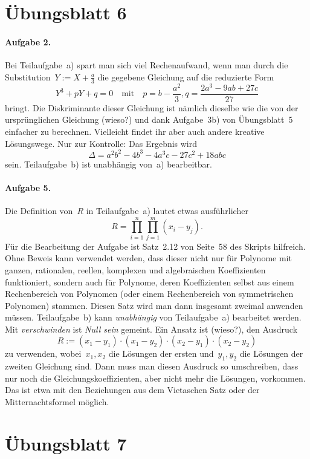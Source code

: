 \documentclass{../algblatt}
\begin{document}
\section*{Übungsblatt 6}

\paragraph{Aufgabe 2.} Bei Teilaufgabe~a) spart man sich viel Rechenaufwand,
wenn man durch die Substitution~$Y := X + \frac{a}{3}$ die gegebene Gleichung
auf die reduzierte Form
\[ Y^3 + pY + q = 0 \quad\text{mit}\quad
  p = b - \frac{a^2}{3}, q = \frac{2a^3 - 9ab + 27c}{27} \]
bringt. Die Diskriminante dieser Gleichung ist nämlich dieselbe wie die von der
ursprünglichen Gleichung (wieso?) und dank Aufgabe~3b) von Übungsblatt~5
einfacher zu berechnen. Vielleicht findet ihr aber auch andere kreative
Lösungswege. Nur zur Kontrolle: Das Ergebnis wird
\[ \Delta = a^2b^2 - 4b^3 - 4a^3c - 27c^2 + 18abc \]
sein. Teilaufgabe~b) ist unabhängig von~a) bearbeitbar.

\paragraph{Aufgabe 5.} Die Definition von~$R$ in Teilaufgabe~a) lautet etwas
ausführlicher
\[ R = \prod_{i=1}^n \prod_{j=1}^m (x_i - y_j). \]
Für die Bearbeitung der Aufgabe ist Satz~2.12 von Seite~58 des Skripts
hilfreich. Ohne Beweis kann verwendet werden, dass dieser nicht nur für
Polynome mit ganzen, rationalen, reellen, komplexen und algebraischen
Koeffizienten funktioniert, sondern auch für Polynome, deren Koeffizienten
selbst aus einem Rechenbereich von Polynomen (oder einem Rechenbereich von
symmetrischen Polynomen) stammen. Diesen Satz wird man dann insgesamt zweimal
anwenden müssen. Teilaufgabe~b) kann \emph{unabhängig} von Teilaufgabe~a)
bearbeitet werden. Mit \emph{verschwinden} ist \emph{Null sein} gemeint. Ein
Ansatz ist (wieso?), den Ausdruck
\[ R := (x_1 - y_1) \cdot (x_1 - y_2) \cdot (x_2 - y_1) \cdot (x_2 - y_2) \]
zu verwenden, wobei~$x_1,x_2$ die Lösungen der ersten und~$y_1,y_2$ die
Lösungen der zweiten Gleichung sind. Dann muss man diesen Ausdruck so
umschreiben, dass nur noch die Gleichungskoeffizienten, aber nicht mehr die
Lösungen, vorkommen. Das ist etwa mit den Beziehungen aus dem Vietaschen Satz
oder der Mitternachtsformel möglich.


\section*{Übungsblatt 7}
\end{document}
